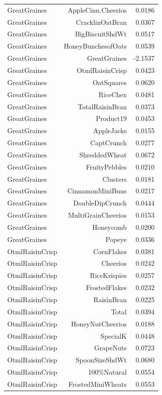 \begin{longtable}{@{}lrr@{}}
GreatGraines & AppleCinn.Cheerios & 0.0186 \\
GreatGraines & CracklinOatBran & 0.0367 \\
GreatGraines & BigBiscuitShdWt & 0.0517 \\
GreatGraines & HoneyBunchesofOats & 0.0539 \\
GreatGraines & GreatGraines & -2.1537 \\
GreatGraines & OtmlRaisinCrisp & 0.0423 \\
GreatGraines & OatSquares & 0.0620 \\
GreatGraines & RiceChex & 0.0481 \\
GreatGraines & TotalRaisinBran & 0.0373 \\
GreatGraines & Product19 & 0.0453 \\
GreatGraines & AppleJacks & 0.0155 \\
GreatGraines & CaptCrunch & 0.0277 \\
GreatGraines & ShreddedWheat & 0.0672 \\
GreatGraines & FruityPebbles & 0.0210 \\
GreatGraines & Clusters & 0.0181 \\
GreatGraines & CinnamonMiniBuns & 0.0217 \\
GreatGraines & DoubleDipCrunch & 0.0444 \\
GreatGraines & MultiGrainCheerios & 0.0153 \\
GreatGraines & Honeycomb & 0.0200 \\
GreatGraines & Popeye & 0.0336 \\
OtmlRaisinCrisp & CornFlakes & 0.0381 \\
OtmlRaisinCrisp & Cheerios & 0.0242 \\
OtmlRaisinCrisp & RiceKrispies & 0.0257 \\
OtmlRaisinCrisp & FrostedFlakes & 0.0232 \\
OtmlRaisinCrisp & RaisinBran & 0.0225 \\
OtmlRaisinCrisp & Total & 0.0394 \\
OtmlRaisinCrisp & HoneyNutCheerios & 0.0188 \\
OtmlRaisinCrisp & SpecialK & 0.0448 \\
OtmlRaisinCrisp & GrapeNuts & 0.0723 \\
OtmlRaisinCrisp & SpoonSizeShdWt & 0.0680 \\
OtmlRaisinCrisp & 100\%Natural & 0.0554 \\
OtmlRaisinCrisp & FrostedMiniWheats & 0.0553 \\

\end{longtable}
